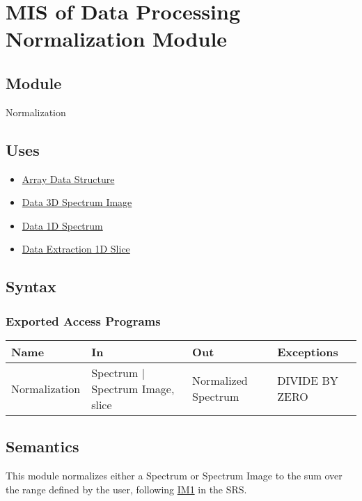 \documentclass[12pt, titlepage]{article}
\begin{document}
\section{MIS of Data Processing Normalization Module} \label{Mod:Normalization}

\subsection{Module}
Normalization

\subsection{Uses}
\begin{itemize}
    \item \hyperref[Mod:Array]{Array Data Structure}
    \item \hyperref[Mod:SI]{Data 3D Spectrum Image}
    \item \hyperref[Mod:Spectrum]{Data 1D Spectrum}
    \item \hyperref[Mod:Slice1D]{Data Extraction 1D Slice}
\end{itemize}

\subsection{Syntax}

\subsubsection{Exported Access Programs}

\begin{center}
    \begin{tabular}{p{3cm} p{4cm} p{4cm} p{2cm}}
        \hline
        \textbf{Name} & \textbf{In} & \textbf{Out} & \textbf{Exceptions} \\
        \hline
        Normalization & Spectrum $|$ Spectrum Image, slice & Normalized Spectrum &
        DIVIDE BY ZERO \\
        \hline
    \end{tabular}
\end{center}

\subsection{Semantics}
This module normalizes either a Spectrum or Spectrum Image to the sum over the
range defined by the user, following \hyperref[normalization]{IM1} in the SRS.
\end{document}
